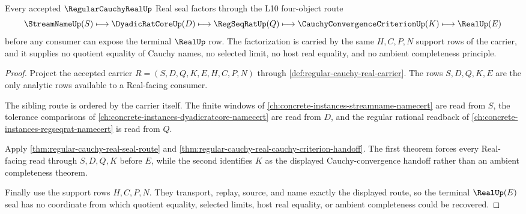 \begin{theorem}
\label{thm:regular-cauchy-real-seal-factorization}
Every accepted $\RegularCauchyRealUp$ Real seal factors through the L10 four-object route
$$
\StreamNameUp(S) \longmapsto \DyadicRatCoreUp(D) \longmapsto \RegSeqRatUp(Q) \longmapsto \CauchyConvergenceCriterionUp(K) \longmapsto \RealUp(E)
$$
before any consumer can expose the terminal $\RealUp$ row. The factorization is carried by the same $H,C,P,N$ support rows of the carrier, and it supplies no quotient equality of Cauchy names, no selected limit, no host real equality, and no ambient completeness principle.
\end{theorem}
\begin{proof}
Project the accepted carrier $R=(S,D,Q,K,E,H,C,P,N)$ through \autoref{def:regular-cauchy-real-carrier}. The rows $S,D,Q,K,E$ are the only analytic rows available to a Real-facing consumer.

The sibling route is ordered by the carrier itself. The finite windows of \autoref{ch:concrete-instances-streamname-namecert} are read from $S$, the tolerance comparisons of \autoref{ch:concrete-instances-dyadicratcore-namecert} are read from $D$, and the regular rational readback of \autoref{ch:concrete-instances-regseqrat-namecert} is read from $Q$.

Apply \autoref{thm:regular-cauchy-real-seal-route} and \autoref{thm:regular-cauchy-real-cauchy-criterion-handoff}. The first theorem forces every Real-facing read through $S,D,Q,K$ before $E$, while the second identifies $K$ as the displayed Cauchy-convergence handoff rather than an ambient completeness theorem.

Finally use the support rows $H,C,P,N$. They transport, replay, source, and name exactly the displayed route, so the terminal $\RealUp(E)$ seal has no coordinate from which quotient equality, selected limits, host real equality, or ambient completeness could be recovered.
\end{proof}

